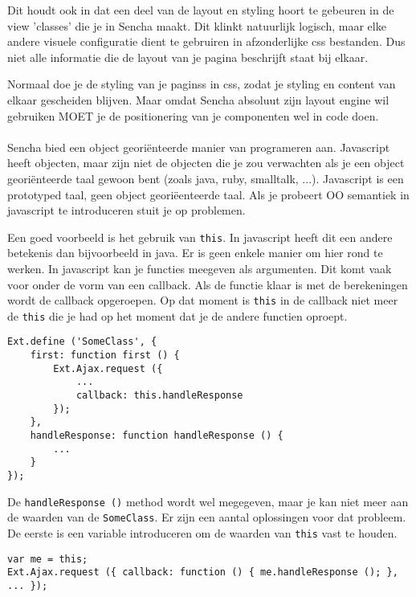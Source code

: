 Dit houdt ook in dat een deel van de layout en styling hoort te gebeuren in de view
'classes' die je in Sencha maakt. Dit klinkt natuurlijk logisch, maar elke andere visuele
configuratie dient te gebruiren in afzonderlijke css bestanden. Dus niet alle informatie
die de layout van je pagina beschrijft staat bij elkaar.

Normaal doe je de styling van je paginss in css, zodat je styling en content van elkaar
gescheiden blijven. Maar omdat Sencha absoluut zijn layout engine wil gebruiken MOET je de
positionering van je componenten wel in code doen.

\paragraph {} Sencha bied een object georiënteerde manier van programeren aan. Javascript
heeft objecten, maar zijn niet de objecten die je zou verwachten als je een object
georiënteerde taal gewoon bent (zoals java, ruby, smalltalk, ...). Javascript is een
prototyped taal, geen object georiëenteerde taal. Als je probeert OO semantiek in
javascript te introduceren stuit je op problemen.

Een goed voorbeeld is het gebruik van \lstinline{this}. In javascript heeft dit een andere
betekenis dan bijvoorbeeld in java. Er is geen enkele manier om hier rond te werken. In
javascript kan je functies meegeven als argumenten. Dit komt vaak voor onder de vorm van
een callback. Als de functie klaar is met de berekeningen wordt de callback opgeroepen. Op
dat moment is \lstinline{this} in de callback niet meer de \lstinline{this} die je had op
het moment dat je de andere functien oproept.

\begin{lstlisting}[language=ownjavascript]
Ext.define ('SomeClass', {
	first: function first () {
		Ext.Ajax.request ({
			...
			callback: this.handleResponse
		});
	},
	handleResponse: function handleResponse () {
		...
	}
});
\end{lstlisting}

De \lstinline{handleResponse ()} method wordt wel megegeven, maar je kan niet meer aan de
waarden van de \lstinline{SomeClass}. Er zijn een aantal oplossingen voor dat probleem. De
eerste is een variable introduceren om de waarden van \lstinline{this} vast te houden.

\begin{lstlisting}[language=ownjavascript]
var me = this;
Ext.Ajax.request ({ callback: function () { me.handleResponse (); }, ... });
\end{lstlisting}

